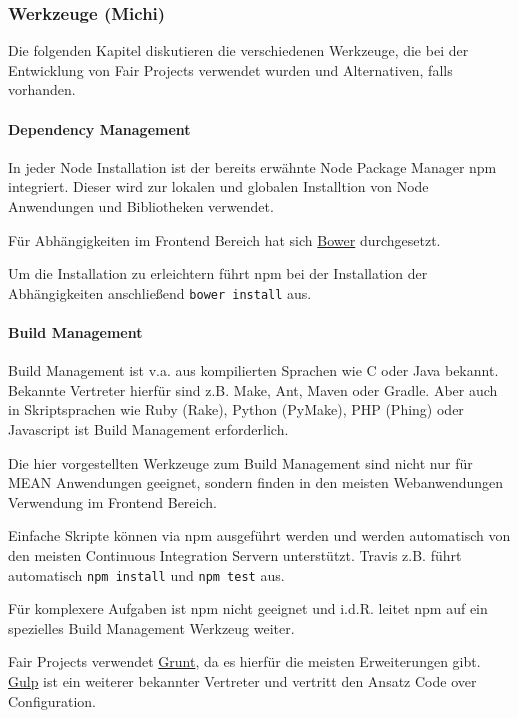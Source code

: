 \subsubsection{Werkzeuge (Michi)}\label{werkzeuge-michi}

Die folgenden Kapitel diskutieren die verschiedenen Werkzeuge, die bei
der Entwicklung von Fair Projects verwendet wurden und Alternativen,
falls vorhanden.

\paragraph{Dependency Management}\label{dependency-management}

In jeder Node Installation ist der bereits erwähnte Node Package Manager
npm integriert. Dieser wird zur lokalen und globalen Installtion von
Node Anwendungen und Bibliotheken verwendet.

Für Abhängigkeiten im Frontend Bereich hat sich
\href{http://bower.io/}{Bower} durchgesetzt.

Um die Installation zu erleichtern führt npm bei der Installation der
Abhängigkeiten anschließend \texttt{bower\ install} aus.

\paragraph{Build Management}\label{build-management}

Build Management ist v.a. aus kompilierten Sprachen wie C oder Java
bekannt. Bekannte Vertreter hierfür sind z.B. Make, Ant, Maven oder
Gradle. Aber auch in Skriptsprachen wie Ruby (Rake), Python (PyMake),
PHP (Phing) oder Javascript ist Build Management erforderlich.

Die hier vorgestellten Werkzeuge zum Build Management sind nicht nur für
MEAN Anwendungen geeignet, sondern finden in den meisten Webanwendungen
Verwendung im Frontend Bereich.

Einfache Skripte können via npm ausgeführt werden und werden automatisch
von den meisten Continuous Integration Servern unterstützt. Travis z.B.
führt automatisch \texttt{npm\ install} und \texttt{npm\ test} aus.

Für komplexere Aufgaben ist npm nicht geeignet und i.d.R. leitet npm auf
ein spezielles Build Management Werkzeug weiter.

Fair Projects verwendet \href{gruntjs.com}{Grunt}, da es hierfür die
meisten Erweiterungen gibt. \href{http://gulpjs.com/}{Gulp} ist ein
weiterer bekannter Vertreter und vertritt den Ansatz Code over
Configuration.

